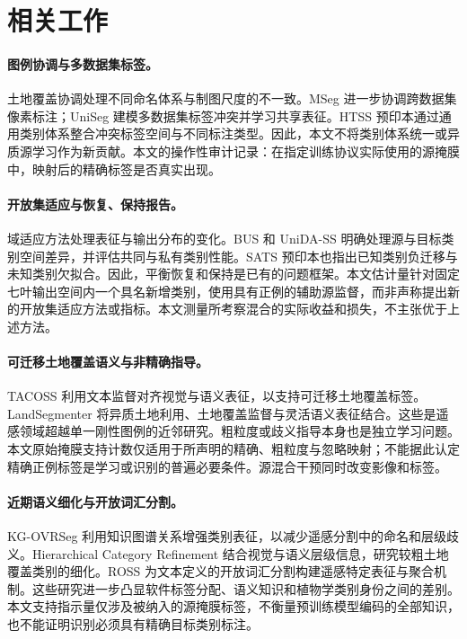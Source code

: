 \section{相关工作}
\label{sec:related_work}
\paragraph{图例协调与多数据集标签。}
土地覆盖协调处理不同命名体系与制图尺度的不一致\citep{yang2017harmonization,baudoux2021translation}。MSeg 进一步协调跨数据集像素标注\citep{lambert2020mseg}；UniSeg 建模多数据集标签冲突并学习共享表征\citep{kim2022uniseg}。HTSS 预印本通过通用类别体系整合冲突标签空间与不同标注类型\citep{meletis2023htss}。因此，本文不将类别体系统一或异质源学习作为新贡献。本文的操作性审计记录：在指定训练协议实际使用的源掩膜中，映射后的精确标签是否真实出现。

\paragraph{开放集适应与恢复、保持报告。}
域适应方法处理表征与输出分布的变化\citep{ganin2016dann,hoffman2018cycada,vu2019advent,zou2018classbalanced}。BUS 和 UniDA-SS 明确处理源与目标类别空间差异，并评估共同与私有类别性能\citep{choe2024bus,choe2025unida}。SATS 预印本也指出已知类别负迁移与未知类别欠拟合\citep{ren2026sats}。因此，平衡恢复和保持是已有的问题框架。本文估计量针对固定七叶输出空间内一个具名新增类别，使用具有正例的辅助源监督，而非声称提出新的开放集适应方法或指标。本文测量所考察混合的实际收益和损失，不主张优于上述方法。

\paragraph{可迁移土地覆盖语义与非精确指导。}
TACOSS 利用文本监督对齐视觉与语义表征，以支持可迁移土地覆盖标签\citep{zermatten2025tacoss}。LandSegmenter 将异质土地利用、土地覆盖监督与灵活语义表征结合\citep{liu2026landsegmenter}。这些是遥感领域超越单一刚性图例的近邻研究。粗粒度或歧义指导本身也是独立学习问题\citep{li2024exactguidance,cour2011partial}。本文原始掩膜支持计数仅适用于所声明的精确、粗粒度与忽略映射；不能据此认定精确正例标签是学习或识别的普遍必要条件。源混合干预同时改变影像和标签。

\paragraph{近期语义细化与开放词汇分割。}
KG-OVRSeg 利用知识图谱关系增强类别表征，以减少遥感分割中的命名和层级歧义\citep{huang2026kgovrseg}。Hierarchical Category Refinement 结合视觉与语义层级信息，研究较粗土地覆盖类别的细化\citep{xiong2026hcr}。ROSS 为文本定义的开放词汇分割构建遥感特定表征与聚合机制\citep{zhang2026ross}。这些研究进一步凸显软件标签分配、语义知识和植物学类别身份之间的差别。本文支持指示量仅涉及被纳入的源掩膜标签，不衡量预训练模型编码的全部知识，也不能证明识别必须具有精确目标类别标注。

